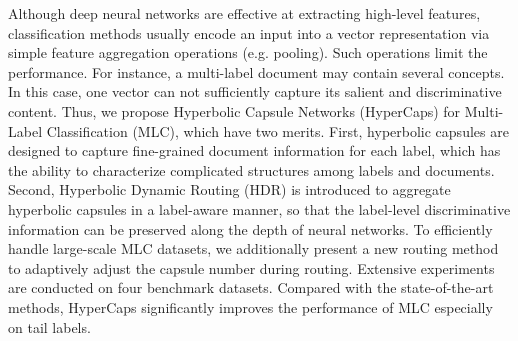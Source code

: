 Although deep neural networks are effective at extracting high-level features, classification methods usually encode an input into a vector representation via simple feature aggregation operations (e.g. pooling). Such operations limit the performance. For instance, a multi-label document may contain several concepts. In this case, one vector can not sufficiently capture its salient and discriminative content. Thus, we propose Hyperbolic Capsule Networks (HyperCaps) for Multi-Label Classification (MLC), which have two merits. First, hyperbolic capsules are designed to capture fine-grained document information for each label, which has the ability to characterize complicated structures among labels and documents. Second, Hyperbolic Dynamic Routing (HDR) is introduced to aggregate hyperbolic capsules in a label-aware manner, so that the label-level discriminative information can be preserved along the depth of neural networks. To efficiently handle large-scale MLC datasets, we additionally present a new routing method to adaptively adjust the capsule number during routing. Extensive experiments are conducted on four benchmark datasets. Compared with the state-of-the-art methods, HyperCaps significantly improves the performance of MLC especially on tail labels.
